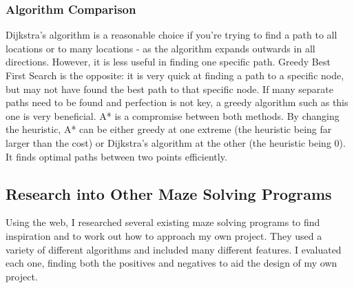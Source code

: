 \documentclass[titlepage]{article}
\begin{document}
\subsubsection{Algorithm Comparison}
Dijkstra's algorithm is a reasonable choice if you're trying to find a path to all locations or to many locations - as the algorithm expands outwards in all directions. However, it is less useful in finding one specific path. Greedy Best First Search is the opposite: it is very quick at finding a path to a specific node, but may not have found the best path to that specific node. If many separate paths need to be found and perfection is not key, a greedy algorithm such as this one is very beneficial. A* is a compromise between both methods. By changing the heuristic, A* can be either greedy at one extreme (the heuristic being far larger than the cost) or Dijkstra's algorithm at the other (the heuristic being 0). It finds optimal paths between two points efficiently.

\subsection{Research into Other Maze Solving Programs}
Using the web, I researched several existing maze solving programs to find inspiration and to work out how to approach my own project. They used a variety of different algorithms and included many different features. I evaluated each one, finding both the positives and negatives to aid the design of my own project.
\end{document}

